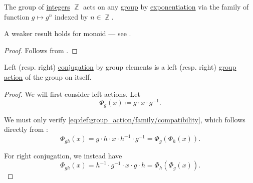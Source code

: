 \begin{proposition}\label{thm:exponentiation_group_action}
  The group of \hyperref[def:integers]{integers} \( \BbbZ \) acts on any \hyperref[def:group]{group} by \hyperref[def:monoid/exponentiation]{exponentiation} via the family of function \( g \mapsto g^n \) indexed by \( n \in \BbbZ \).
\end{proposition}
\begin{comments}
  \item A weaker result holds for monoid --- see .
\end{comments}
\begin{proof}
  Follows from .
\end{proof}

\begin{proposition}\label{thm:group_conjugation_action}
  Left (resp. right) \hyperref[def:group_conjugation]{conjugation} by group elements is a left (resp. right) \hyperref[def:group_action]{group action} of the group on itself.
\end{proposition}
\begin{proof}
  We will first consider left actions. Let
  \begin{equation*}
    \Phi_g(x) \coloneqq g \cdot x \cdot g^{-1}.
  \end{equation*}

  We must only verify \eqref{eq:def:group_action/family/compatibility}, which follows directly from :
  \begin{equation*}
    \Phi_{gh}(x)
    =
    g \cdot h \cdot x \cdot h^{-1} \cdot g^{-1}
    =
    \Phi_g(\Phi_h(x)).
  \end{equation*}

  For right conjugation, we instead have
  \begin{equation*}
    \Phi_{gh}(x)
    =
    h^{-1} \cdot g^{-1} \cdot x \cdot g \cdot h
    =
    \Phi_h(\Phi_g(x)).
  \end{equation*}
\end{proof}

